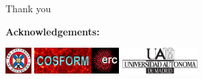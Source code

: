 \documentclass[aspectratio=169]{beamer}
\begin{document}
\begin{frame}[plain, c]
    \begin{center}
        \Huge{Thank you}

    \bigskip
    
    \bigskip
    
    \bigskip
    
    {\small \bf Acknowledgements:}
    
    \includegraphics[height=1cm]{ifalogo.jpg}
    \includegraphics[height=1cm]{cosform_logo.png}
    \includegraphics[height=1cm]{logo_uam.jpg}
    \end{center}
\end{frame}
\end{document}
